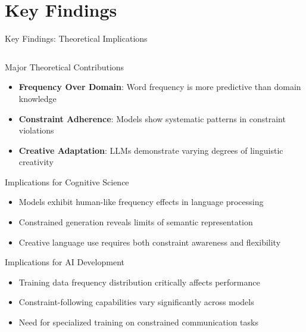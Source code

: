 \documentclass[aspectratio=169]{beamer}
\begin{document}
\section{Key Findings}

\begin{frame}{Key Findings: Theoretical Implications}
\begin{columns}[c]
\begin{column}{0.5\textwidth}
\begin{alertblock}{Major Theoretical Contributions}
\begin{itemize}
    \item \textbf{Frequency Over Domain}: Word frequency is more predictive than domain knowledge
    \item \textbf{Constraint Adherence}: Models show systematic patterns in constraint violations
    \item \textbf{Creative Adaptation}: LLMs demonstrate varying degrees of linguistic creativity
\end{itemize}
\end{alertblock}

\begin{block}{Implications for Cognitive Science}
\begin{itemize}
    \item Models exhibit human-like frequency effects in language processing
    \item Constrained generation reveals limits of semantic representation
    \item Creative language use requires both constraint awareness and flexibility
\end{itemize}
\end{block}

\begin{block}{Implications for AI Development}
\begin{itemize}
    \item Training data frequency distribution critically affects performance
    \item Constraint-following capabilities vary significantly across models
    \item Need for specialized training on constrained communication tasks
\end{itemize}
\end{block}
\end{column}


\end{columns}
\end{frame}
\end{document}
